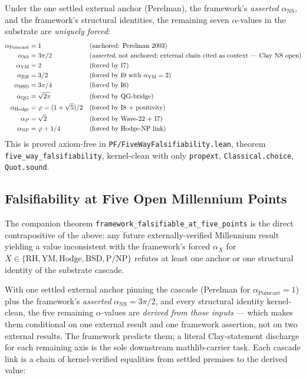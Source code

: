 \begin{keyidea}
Under the one settled external anchor (Perelman), the framework's
\emph{asserted} $\alpha_{\text{NS}}$, and the framework's structural
identities, the remaining seven $\alpha$-values in the substrate
are \emph{uniquely forced}:
\begin{align*}
\alpha_{\text{Poincar\'e}} &= 1 &&\text{(anchored: Perelman 2003)} \\
\alpha_{\text{NS}} &= 3\pi/2 &&\text{(\emph{asserted}, not anchored; external chain cited as context --- Clay NS open)} \\
\alpha_{\text{YM}} &= 2 &&\text{(forced by I7)} \\
\alpha_{\text{RH}} &= 3/2 &&\text{(forced by I9 with $\alpha_{\text{YM}}=2$)} \\
\alpha_{\text{BSD}} &= 3\pi/4 &&\text{(forced by I6)} \\
\alpha_{\text{QG}} &= \sqrt{2\pi} &&\text{(forced by QG-bridge)} \\
\alpha_{\text{Hodge}} &= \varphi = (1+\sqrt{5})/2 &&\text{(forced by I8 + positivity)} \\
\alpha_P &= \sqrt{2} &&\text{(forced by Wave-22 + I7)} \\
\alpha_{\text{NP}} &= \varphi + 1/4 &&\text{(forced by Hodge-NP link)}
\end{align*}
This is proved axiom-free in
\texttt{PF/FiveWayFalsifiability.lean}, theorem
\texttt{five\_way\_falsifiability}, kernel-clean with only
\texttt{propext}, \texttt{Classical.choice}, \texttt{Quot.sound}.
\end{keyidea}

\subsection{Falsifiability at Five Open Millennium Points}

The companion theorem
\texttt{framework\_falsifiable\_at\_five\_points} is the direct
contrapositive of the above: any future externally-verified Millennium
result yielding a value inconsistent with the framework's forced
$\alpha_X$ for $X \in \{\text{RH}, \text{YM}, \text{Hodge},
\text{BSD}, \text{P/NP}\}$ refutes at least one anchor or one
structural identity of the substrate cascade.

With one settled external anchor pinning the cascade (Perelman for
$\alpha_{\text{Poincar\'e}} = 1$) plus the framework's \emph{asserted}
$\alpha_{\text{NS}} = 3\pi/2$, and every structural identity kernel-clean, the
five remaining $\alpha$-values are \emph{derived from those inputs} --- which
makes them conditional on one external result and one framework assertion, not
on two external results. The framework
predicts them; a literal Clay-statement discharge for each remaining
axis is the sole downstream mathlib-carrier task. Each cascade link
is a chain of kernel-verified equalities from settled premises to
the derived value:


